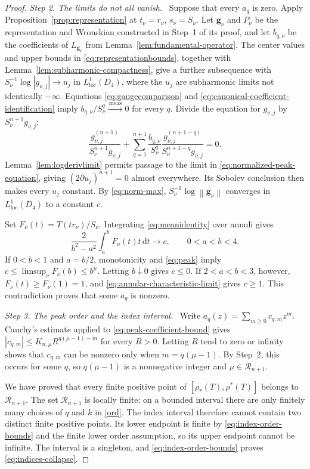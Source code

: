 \documentclass[11pt,letterpaper,reqno]{amsart}
\theoremstyle{remark}
\numberwithin{equation}{section}
\newcommand{\loc}{\mathrm{loc}}
\newcommand{\norm}[1]{\left\lVert#1\right\rVert}
\newcommand{\convmeas}{\xrightarrow{\,\mathrm{meas}\,}}
\newcommand{\gv}{\bm g}
\newcommand{\Gn}{\mathcal R_{n+1}}
\newcommand{\step}[1]{\medskip\noindent\emph{#1}\ }
\begin{document}
\begin{proof}
\step{Step 2. The limits do not all vanish.}
Suppose that every $a_q$ is zero. Apply
Proposition~\ref{prop:representation} at $t_\nu=r_\nu$, $s_\nu=S_\nu$.
Let $\gv_\nu$ and $P_\nu$ be the representation and Wronskian constructed
in Step~1 of its proof, and let $b_{q,\nu}$ be the coefficients of
$L_{\gv_\nu}$ from Lemma~\ref{lem:fundamental-operator}. The center values and upper bounds in \eqref{eq:representationbounds},
together with Lemma~\ref{lem:subharmonic-compactness}, give a further
subsequence with
$S_\nu^{-1}\log|g_{\nu,j}|\to u_j$ in $L^1_{\loc}(D_4)$, where the
$u_j$ are subharmonic limits not identically $-\infty$. Equations
\eqref{eq:gaugecomparison} and \eqref{eq:canonical-coefficient-identification}
imply $b_{q,\nu}/S_\nu^q\convmeas0$ for every $q$.
Divide the equation for $g_{\nu,j}$ by $S_\nu^{n+1}g_{\nu,j}$:
\begin{equation}\label{eq:normalized-peak-equation}
 \frac{g_{\nu,j}^{(n+1)}}{S_\nu^{n+1}g_{\nu,j}}
 +\sum_{q=1}^{n+1}\frac{b_{q,\nu}}{S_\nu^q}
       \frac{g_{\nu,j}^{(n+1-q)}}{S_\nu^{n+1-q}g_{\nu,j}}=0.
\end{equation}
Lemma~\ref{lem:logderivlimit} permits passage to the limit in
\eqref{eq:normalized-peak-equation}, giving $(2\partial u_j)^{n+1}=0$ almost
everywhere. Its Sobolev conclusion then makes every $u_j$ constant.
By \eqref{eq:norm-max}, $S_\nu^{-1}\log\norm{\gv_\nu}$ converges in
$L^1_{\loc}(D_4)$ to a constant $c$.

Set $F_\nu(t)=T(tr_\nu)/S_\nu$. Integrating \eqref{eq:meanidentity} over
annuli gives
\begin{equation}\label{eq:annular-characteristic-limit}
 \frac{2}{b^2-a^2}\int_a^b F_\nu(t)t\,\mathrm dt\longrightarrow c,
 \qquad 0<a<b<4.
\end{equation}
If $0<b<1$ and $a=b/2$, monotonicity and \eqref{eq:peak} imply
$c\le\limsup_\nu F_\nu(b)\le b^\mu$. Letting $b\downarrow0$ gives $c\le0$.
If $2<a<b<3$, however, $F_\nu(t)\ge F_\nu(1)=1$, and
\eqref{eq:annular-characteristic-limit} gives $c\ge1$. This contradiction
proves that some $a_q$ is nonzero.

\step{Step 3. The peak order and the index interval.}
Write $a_q(z)=\sum_{m\ge0}c_{q,m}z^m$. Cauchy's estimate applied to
\eqref{eq:peak-coefficient-bound} gives
$|c_{q,m}|\le K_{n,\mu}R^{q(\mu-1)-m}$ for every $R>0$.
Letting $R$ tend to zero or infinity shows that $c_{q,m}$ can be nonzero
only when $m=q(\mu-1)$. By Step~2, this occurs for some $q$, so
$q(\mu-1)$ is a nonnegative integer and $\mu\in\Gn$.

We have proved that every finite positive point of
$[\rho_*(T),\rho^*(T)]$ belongs to $\Gn$. The set $\Gn$ is locally finite:
on a bounded interval there are only finitely many choices of $q$ and $k$
in \eqref{ord}. The index interval therefore cannot contain two distinct
finite positive points. Its lower endpoint is finite by
\eqref{eq:index-order-bounds} and the finite lower order assumption, so its
upper endpoint cannot be infinite. The interval is a singleton, and
\eqref{eq:index-order-bounds} proves \eqref{eq:indices-collapse}.
\end{proof}
\end{document}
